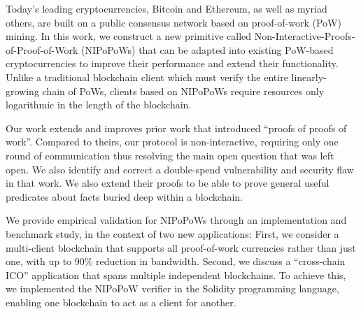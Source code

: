 Today's leading cryptocurrencies, Bitcoin and Ethereum, as well as myriad others, are built on a public consensus network based on proof-of-work (PoW) mining. In this work, we construct a new primitive called Non-Interactive-Proofs-of-Proof-of-Work (NIPoPoWs) that can be adapted into existing PoW-based cryptocurrencies to improve their performance and extend their functionality.
Unlike a traditional blockchain client
which must verify the entire linearly-growing chain of PoWs, clients based on
NIPoPoWs require resources only logarithmic in the length of the blockchain.

Our work  extends and improves prior work that introduced ``proofs of proofs of work''. Compared to theirs, our protocol is non-interactive, requiring only one round of communication thus resolving the main open question that was left open. We also identify and correct a double-spend vulnerability and security flaw in that work.
We also extend their proofs to be able to prove general useful predicates about
facts buried deep within a blockchain.

We provide empirical validation for NIPoPoWs through an implementation and
benchmark study, in the context of two new applications: First, we consider a
multi-client blockchain that supports all proof-of-work currencies rather than
just one, with up to 90\% reduction in bandwidth.  Second, we discuss a
``cross-chain ICO'' application that spans multiple independent blockchains. To
achieve this, we implemented the NIPoPoW verifier in the Solidity programming
language, enabling one blockchain to act as a client for another.
